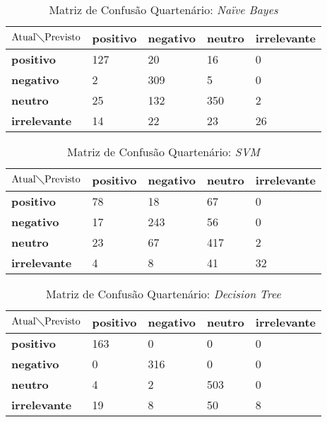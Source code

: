 \begin{table}[h!]
\centering
\caption{Matriz de Confusão Quartenário: \textit{Naïve Bayes}}
\label{tab:mcq-nb}
\begin{tabular}{|l|l|l|l|l|}
\hline
$\textrm{Atual}\diagdown\textrm{Previsto}$ & \textbf{positivo} & \textbf{negativo} & \textbf{neutro} & \textbf{irrelevante}\\ \hline
\textbf{positivo} & 127 & 20 & 16 & 0\\ \hline
\textbf{negativo} & 2 & 309 & 5 & 0\\ \hline
\textbf{neutro} & 25 & 132 & 350 & 2 \\ \hline
\textbf{irrelevante} & 14 & 22 & 23 & 26 \\ \hline
\end{tabular}
\end{table}

\begin{table}[h!]
\centering
\caption{Matriz de Confusão Quartenário: \textit{SVM}}
\label{tab:mcq-smv}
\begin{tabular}{|l|l|l|l|l|}
\hline
$\textrm{Atual}\diagdown\textrm{Previsto}$ & \textbf{positivo} & \textbf{negativo} & \textbf{neutro} & \textbf{irrelevante}\\ \hline
\textbf{positivo} & 78 & 18 & 67 & 0\\ \hline
\textbf{negativo} & 17 & 243 & 56 & 0\\ \hline
\textbf{neutro} & 23 & 67 & 417 & 2 \\ \hline
\textbf{irrelevante} & 4 & 8 & 41 & 32 \\ \hline
\end{tabular}
\end{table}

\begin{table}[h!]
\centering
\caption{Matriz de Confusão Quartenário: \textit{Decision Tree}}
\label{tab:mcq-nb}
\begin{tabular}{|l|l|l|l|l|}
\hline
$\textrm{Atual}\diagdown\textrm{Previsto}$ & \textbf{positivo} & \textbf{negativo} & \textbf{neutro} & \textbf{irrelevante}\\ \hline
\textbf{positivo} & 163 & 0 & 0 & 0\\ \hline
\textbf{negativo} & 0 & 316 & 0 & 0\\ \hline
\textbf{neutro} & 4 & 2 & 503 & 0 \\ \hline
\textbf{irrelevante} & 19 & 8 & 50 & 8 \\ \hline
\end{tabular}
\end{table}

